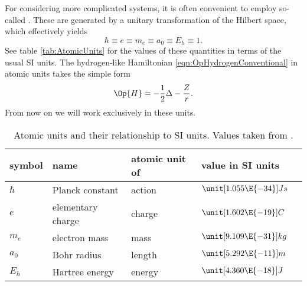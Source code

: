 For considering more complicated systems,
it is often convenient to employ so-called .
These are generated by a unitary transformation of the Hilbert space,
which effectively yields
\[ \hbar \equiv e \equiv m_e \equiv a_0 \equiv E_h \equiv 1. \]
See table \vref{tab:AtomicUnits} for the values of these quantities
in terms of the usual SI units.
The hydrogen-like Hamiltonian \vref{eqn:OpHydrogenConventional}
in atomic units takes the simple form
\begin{equation}
	\Op{H} = -\frac12 \Delta - \frac{Z}{r}.
	\label{eqn:OpHydrogen}
\end{equation}
From now on we will work exclusively in these units.
\begin{table}
	\centering
	\begin{tabular}{lllll}
		\toprule
		symbol & name & atomic unit of & value in SI units \\
		\midrule
		$\hbar$ & Planck constant & action & $\unit[1.055\E{-34}]{Js}$ \\
		$e$ & elementary charge & charge & $\unit[1.602\E{-19}]{C}$ \\
		$m_e$ & electron mass & mass & $\unit[9.109\E{-31}]{kg}$ \\
		$a_0$ & Bohr radius & length & $\unit[5.292\E{-11}]{m}$ \\
		$E_h$ & Hartree energy & energy & $\unit[4.360\E{-18}]{J}$ \\
		\bottomrule
	\end{tabular}
	\caption{Atomic units and their relationship to SI units. Values taken from \cite{CODATA2014}.}
	\label{tab:AtomicUnits}
\end{table}
